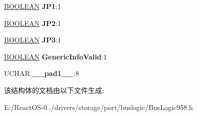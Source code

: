 \begin{DoxyCompactItemize}
\hyperlink{_processor_bind_8h_a112e3146cb38b6ee95e64d85842e380a}{B\+O\+O\+L\+E\+AN} {\bfseries J\+P1}\+:1
\item 
\mbox{\label{struct_bus_logic___p_c_i_host_adapter_information_a4878c6c1fb08d70a6bed60f4b707b19e}} 
\hyperlink{_processor_bind_8h_a112e3146cb38b6ee95e64d85842e380a}{B\+O\+O\+L\+E\+AN} {\bfseries J\+P2}\+:1
\item 
\mbox{\label{struct_bus_logic___p_c_i_host_adapter_information_a9ca63d562afbaee34d08eab2dee3d4b8}} 
\hyperlink{_processor_bind_8h_a112e3146cb38b6ee95e64d85842e380a}{B\+O\+O\+L\+E\+AN} {\bfseries J\+P3}\+:1
\item 
\mbox{\label{struct_bus_logic___p_c_i_host_adapter_information_a358b15f83cf35ebcf80cdc8711e3932d}} 
\hyperlink{_processor_bind_8h_a112e3146cb38b6ee95e64d85842e380a}{B\+O\+O\+L\+E\+AN} {\bfseries Generic\+Info\+Valid}\+:1
\item 
\mbox{\label{struct_bus_logic___p_c_i_host_adapter_information_a64f8c8f7e3473f2f52540c31ec1d140d}} 
U\+C\+H\+AR {\bfseries \+\_\+\+\_\+pad1\+\_\+\+\_\+}\+:8
\end{DoxyCompactItemize}


该结构体的文档由以下文件生成\+:\begin{DoxyCompactItemize}
\item 
E\+:/\+React\+O\+S-\/0../drivers/storage/port/buslogic/Bus\+Logic958.\+h\end{DoxyCompactItemize}
